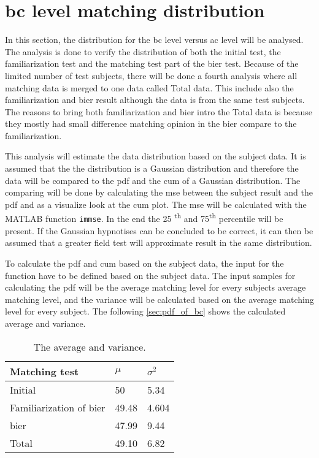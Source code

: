 \section{\gls{bc} level matching distribution}
In this section, the distribution for the \gls{bc} level versus \gls{ac} level will be analysed. The analysis is done to verify the distribution of both the initial test, the familiarization test and the matching test part of the \gls{bier} test. Because of the limited number of test subjects, there will be done a fourth analysis where all matching data is merged to one data called Total data. This include also the familiarization and \gls{bier} result although the data is from the same test subjects. The reasons to bring both familiarization and \gls{bier} intro the Total data is because they mostly had small difference matching opinion in the \gls{bier} compare to the familiarization.


This analysis will estimate the data distribution based on the subject data. It is assumed that the the distribution is a Gaussian distribution and therefore the data will be compared to the \gls{pdf} and the \gls{cum} of a Gaussian distribution. The comparing will be done by calculating the \gls{mse} between the subject result and the \gls{pdf} and as a visualize look at the \gls{cum} plot. The \gls{mse} will be calculated with the MATLAB function \texttt{immse}. In the end the 25 \textsuperscript{th} and 75\textsuperscript{th} percentile will be present. If the Gaussian hypnotises can be concluded to be correct, it can then be assumed that a greater field test will approximate result in the same distribution.

To calculate the \gls{pdf} and \gls{cum} based on the subject data, the input for the function have to be defined based on the subject data. The input samples for calculating the  \gls{pdf} will be the average matching level for every subjects average matching level, and the variance will be calculated based on the average matching level for every subject. The following \autoref{sec:pdf_of_bc} shows the calculated average and variance. 

\begin{table}[H]
\centering
\caption{The average and variance.}
\begin{tabular}{l|ll}
Matching test                 & $\mu$ & $\sigma^2$ \\ \hline
Initial                       & 50    & 5.34       \\
Familiarization of \gls{bier} & 49.48 & 4.604      \\
\gls{bier}                    & 47.99 & 9.44      \\
Total                    & 49.10 & 6.82      
\end{tabular}
\label{sec:pdf_of_bc}
\end{table}

